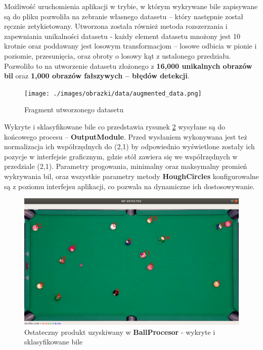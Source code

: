 \documentclass[12pt]{article}
\begin{document}
\begin{enumerate} [noitemsep]
    \vspace{0.5cm}
    
    Możliwość uruchomienia aplikacji w trybie, w którym wykrywane bile zapisywane są do pliku pozwoliła na zebranie własnego datasetu – który następnie został ręcznie zetykietowany. Utworzona została również metoda rozszerzania i zapewniania unikalności datasetu - każdy element datasetu mnożony jest 10 krotnie oraz poddawany jest losowym transformacjom – losowe odbicia w pionie i poziomie, przesunięcia, oraz obroty o losowy kąt z ustalonego przedziału. Pozwoliło to na utworzenie datasetu złożonego z \textbf{16,000 unikalnych obrazów bil} oraz \textbf{1,000 obrazów fałszywych – błędów detekcji}.

    \begin{figure}[!ht]
        \centering
        \texttt{[image: ./images/obrazki/data/augmented\_data.png]}
        \caption{Fragment utworzonego datasetu}
        \label{dataset}
    \end{figure}

    
    Wykryte i sklasyfikowane bile co przedstawia rysunek \ref{bp_classified} wysyłane są do końcowego procesu – \textbf{OutputModule}. Przed wysłaniem wykonywana jest też normalizacja ich współrzędnych do (2,1) by odpowiednio wyświetlone zostały ich pozycje w interfejsie graficznym, gdzie stół zawiera się we współrzędnych w przedziale (2,1). Parametry progowania, minimalny oraz maksymalny promień wykrywania bil, oraz wszystkie parametry metody \textbf{HoughCircles} konfigurowalne są z poziomu interfejsu aplikacji, co pozwala na dynamiczne ich dostosowywanie.

    \begin{figure}[!ht]
        \centering
        \includegraphics[width=15cm]{./images/obrazki/klasyfikacja/bp_classified.png}
        \caption{Ostateczny produkt uzyskiwany w \textbf{BallProcesor} - wykryte i sklasyfikowane bile}
        \label{bp_classified}
    \end{figure}


\end{enumerate}
\end{document}
